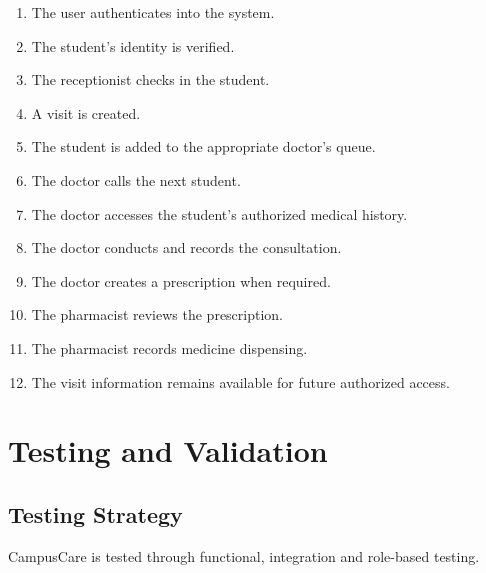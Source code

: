 \documentclass{tietreport}
\begin{document}
\begin{enumerate}

    \item The user authenticates into the system.

    \item The student's identity is verified.

    \item The receptionist checks in the student.

    \item A visit is created.

    \item The student is added to the appropriate doctor's queue.

    \item The doctor calls the next student.

    \item The doctor accesses the student's authorized medical history.

    \item The doctor conducts and records the consultation.

    \item The doctor creates a prescription when required.

    \item The pharmacist reviews the prescription.

    \item The pharmacist records medicine dispensing.

    \item The visit information remains available for future
    authorized access.

\end{enumerate}



\chapter{Testing and Validation}

\section{Testing Strategy}

CampusCare is tested through functional, integration and
role-based testing.
\end{document}
